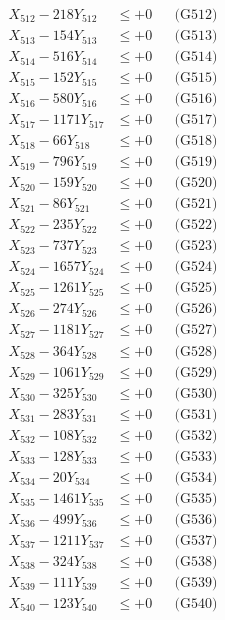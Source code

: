 \documentclass[a4paper,10pt]{article}
\begin{document}
{\begin{align}
X_{512} - 218Y_{512} &\leq +0 && \text{(G512)} \\
X_{513} - 154Y_{513} &\leq +0 && \text{(G513)} \\
X_{514} - 516Y_{514} &\leq +0 && \text{(G514)} \\
X_{515} - 152Y_{515} &\leq +0 && \text{(G515)} \\
X_{516} - 580Y_{516} &\leq +0 && \text{(G516)} \\
X_{517} - 1171Y_{517} &\leq +0 && \text{(G517)} \\
X_{518} - 66Y_{518} &\leq +0 && \text{(G518)} \\
X_{519} - 796Y_{519} &\leq +0 && \text{(G519)} \\
X_{520} - 159Y_{520} &\leq +0 && \text{(G520)} \\
\allowbreak
X_{521} - 86Y_{521} &\leq +0 && \text{(G521)} \\
X_{522} - 235Y_{522} &\leq +0 && \text{(G522)} \\
X_{523} - 737Y_{523} &\leq +0 && \text{(G523)} \\
X_{524} - 1657Y_{524} &\leq +0 && \text{(G524)} \\
X_{525} - 1261Y_{525} &\leq +0 && \text{(G525)} \\
X_{526} - 274Y_{526} &\leq +0 && \text{(G526)} \\
X_{527} - 1181Y_{527} &\leq +0 && \text{(G527)} \\
X_{528} - 364Y_{528} &\leq +0 && \text{(G528)} \\
X_{529} - 1061Y_{529} &\leq +0 && \text{(G529)} \\
X_{530} - 325Y_{530} &\leq +0 && \text{(G530)} \\
\allowbreak
X_{531} - 283Y_{531} &\leq +0 && \text{(G531)} \\
X_{532} - 108Y_{532} &\leq +0 && \text{(G532)} \\
X_{533} - 128Y_{533} &\leq +0 && \text{(G533)} \\
X_{534} - 20Y_{534} &\leq +0 && \text{(G534)} \\
X_{535} - 1461Y_{535} &\leq +0 && \text{(G535)} \\
X_{536} - 499Y_{536} &\leq +0 && \text{(G536)} \\
X_{537} - 1211Y_{537} &\leq +0 && \text{(G537)} \\
X_{538} - 324Y_{538} &\leq +0 && \text{(G538)} \\
X_{539} - 111Y_{539} &\leq +0 && \text{(G539)} \\
X_{540} - 123Y_{540} &\leq +0 && \text{(G540)} \\

\end{align}}
\end{document}
